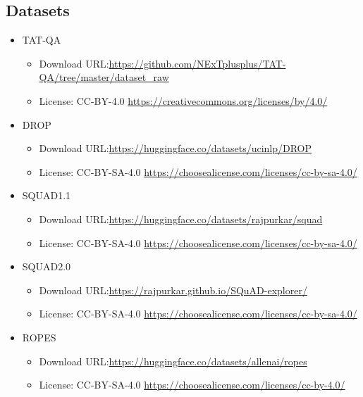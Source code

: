 \documentclass[11pt]{article}
\begin{document}
	\subsection{Datasets}
	
	\begin{itemize}
		
		\item TAT-QA
		\begin{itemize}
			\item Download URL:\newline \url{https://github.com/NExTplusplus/TAT-QA/tree/master/dataset_raw}
			\item License: CC-BY-4.0 \newline \url{https://creativecommons.org/licenses/by/4.0/}
		\end{itemize}
		
		\item DROP
		\begin{itemize}
			\item Download URL:\newline \url{https://huggingface.co/datasets/ucinlp/DROP}
			\item License: CC-BY-SA-4.0 \newline \url{https://choosealicense.com/licenses/cc-by-sa-4.0/}
		\end{itemize}
		
		\item SQUAD1.1
		\begin{itemize}
			\item Download URL:\newline \url{https://huggingface.co/datasets/rajpurkar/squad}
			\item License: CC-BY-SA-4.0 \newline \url{https://choosealicense.com/licenses/cc-by-sa-4.0/}
		\end{itemize}
		
		\item SQUAD2.0
		\begin{itemize}
			\item Download URL:\newline \url{https://rajpurkar.github.io/SQuAD-explorer/}
			\item License: CC-BY-SA-4.0 \newline \url{https://choosealicense.com/licenses/cc-by-sa-4.0/}
		\end{itemize}
		
		\item ROPES
		\begin{itemize}
			\item Download URL:\newline \url{https://huggingface.co/datasets/allenai/ropes}
			\item License: CC-BY-SA-4.0 \newline \url{https://choosealicense.com/licenses/cc-by-4.0/}
		\end{itemize}
		

\end{itemize}
\end{document}
